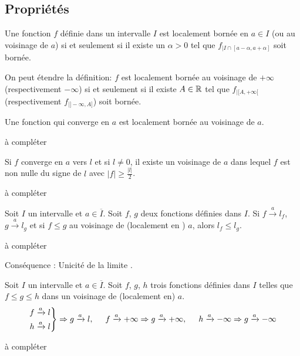 \subsection{Propriétés} 
\begin{defi}
  Une fonction $f$ définie dans un intervalle $I$ est localement bornée en $a\in I$ (ou au voisinage de $a$) si et seulement si il existe un $\alpha > 0$ tel que $f_{|I\cap[a-\alpha,a+\alpha]}$ soit bornée.
\end{defi}
On peut étendre la définition: $f$ est localement bornée au voisinage de $+\infty$ (respectivement $-\infty$) si et seulement si il existe $A\in \mathbb{R}$ tel que 
$f_{|[A,+\infty[}$ (respectivement $f_{|]-\infty, A]}$) soit bornée.
\begin{prop}
Une fonction qui converge en $a$ est localement bornée au voisinage de $a$. 
\end{prop}
\begin{demo}
 à compléter
\end{demo}

\begin{prop}
 Si $f$ converge en $a$ vers $l$ et si $l\neq 0$, il existe un voisinage de $a$ dans lequel $f$ est non nulle du signe de $l$ avec $|f|\geq \frac{|l|}{2}$. 
\end{prop}
\begin{demo}
 à compléter
\end{demo}

\begin{thm}
  Soit $I$ un intervalle et $a\in \overline{I}$. Soit $f$, $g$ deux fonctions définies dans $I$. Si $f \xrightarrow{a} l_f$, $g \xrightarrow{a} l_g$ et si $f \leq g$ au voisinage de (localement en ) $a$, alors $l_f \leq l_g$. 
\end{thm}
\begin{demo}
 à compléter
\end{demo}

Conséquence : Unicité de la limite . 

\begin{thm}
  Soit $I$ un intervalle et $a\in \overline{I}$. Soit $f$, $g$, $h$ trois fonctions définies dans $I$ telles que $f\leq g \leq h$ dans un voisinage de (localement en) $a$.
\[
\left. 
\begin{aligned}
 f &\xrightarrow{a} l \\ h &\xrightarrow{a} l
\end{aligned}
\right\rbrace \Rightarrow g \xrightarrow{a} l, \hspace{0.5cm}
f \xrightarrow{a} +\infty \Rightarrow g \xrightarrow{a} +\infty, \hspace{0.5cm}
h \xrightarrow{a} -\infty \Rightarrow g \xrightarrow{a} -\infty
\]
\end{thm}
\begin{demo}
 à compléter
\end{demo}


